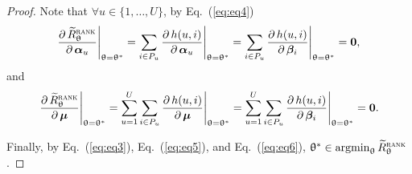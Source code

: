 \begin{proof}
Note that $\forall u \in \{1,\dots,U\}$,
by Eq.~(\ref{eq:eq4})
\begin{equation}
\label{eq:eq5}
\frac{\partial \, \widetilde R_{\uptheta}^{\textsc{rank}}} {\partial \, {\bm{\alpha}}_u} \Bigg|_{\uptheta = \uptheta^*} 
= \sum_{i \in P_u} \frac{\partial \, h(u, i)}{\partial \, {\bm{\alpha}}_u}  \Bigg|_{\uptheta = \uptheta^*}
= \sum_{i \in P_u} \frac{\partial \, h(u, i)}{\partial \, {\bm{\beta}}_i} \Bigg|_{\uptheta = \uptheta^*}
= \mathbf{0},
\end{equation}
and
\begin{equation}
\label{eq:eq6}
\frac{\partial \, \widetilde R_{\uptheta}^{\textsc{rank}}} {\partial \, \bm{\mu}} \Bigg|_{\uptheta = \uptheta^*} 
= \sum_{u=1}^U \sum_{i \in P_u} \frac{\partial \, h(u, i)}{\partial \, \bm{\mu}} \Bigg|_{\uptheta = \uptheta^*}
= \sum_{u=1}^U \sum_{i \in P_u} \frac{\partial \, h(u, i)}{\partial \, {\bm{\beta}}_i} \Bigg|_{\uptheta = \uptheta^*}
= \mathbf{0}.
\end{equation}

Finally, by Eq.~(\ref{eq:eq3}), Eq.~(\ref{eq:eq5}), and Eq.~(\ref{eq:eq6}), $\uptheta^* \in \operatorname*{argmin}_{\uptheta} \widetilde R_{\uptheta}^{\textsc{rank}}$.

\end{proof}
